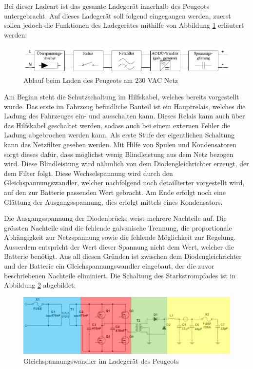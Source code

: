 Bei dieser Ladeart ist das gesamte Ladegerät innerhalb des Peugeots untergebracht. Auf dieses Ladegerät soll folgend eingegangen werden, zuerst sollen jedoch die Funktionen des Ladegerätes mithilfe von Abbildung \ref{fig:Laden_Peugeot} erläutert werden:

\begin{figure}[h]
	\centering
		\includegraphics[width=1.00\textwidth]{images/Laden_Peugeot.PNG}
	\caption{Ablauf beim Laden des Peugeots am $230$ VAC Netz}
	\label{fig:Laden_Peugeot}
\end{figure}

Am Beginn steht die Schutzschaltung im Hilfskabel, welches bereits vorgestellt wurde. Das erste im Fahrzeug befindliche Bauteil ist ein Hauptrelais, welches die Ladung des Fahrzeuges ein- und ausschalten kann. Dieses Relais kann auch über das Hilfskabel geschaltet werden, sodass auch bei einem externen Fehler die Ladung abgebrochen werden kann. Als erste Stufe der eigentlichen Schaltung kann das Netzfilter gesehen werden. Mit Hilfe von Spulen und Kondensatoren sorgt dieses dafür, dass möglichst wenig Blindleistung aus dem Netz bezogen wird. Diese Blindleistung wird nähmlich von dem Diodengleichrichter erzeugt, der dem Filter folgt. Diese Wechselspannung wird durch den Gleichspannungswandler, welcher nachfolgend noch detaillierter vorgestellt wird, auf den zur Batterie passenden Wert gebracht. Am Ende erfolgt noch eine Glättung der Ausgangsspannung, dies erfolgt mittels eines Kondensators.

Die Ausgangsspannung der Diodenbrücke weist mehrere Nachteile auf. Die grössten Nachteile sind die fehlende galvanische Trennung, die proportionale Abhängigkeit zur Netzspannung sowie die fehlende Möglichkeit zur Regelung. Ausserdem entspricht der Wert dieser Spannung nicht dem Wert, welcher die Batterie benötigt. Aus all diesen Gründen ist zwischen dem Diodengleichrichter und der Batterie ein Gleichspannungswandler eingebaut, der die zuvor beschriebenen Nachteile eliminiert. Die Schaltung des Starkstrompfades ist in Abbildung \ref{fig:Ladegeraet_Peugeot} abgebildet:

\begin{figure}[h]
	\centering
		\includegraphics[width=1.00\textwidth]{images/Ladegeraet_Peugeot.PNG}
	\caption{Gleichspannungswandler im Ladegerät des Peugeots}
	\label{fig:Ladegeraet_Peugeot}
\end{figure}

